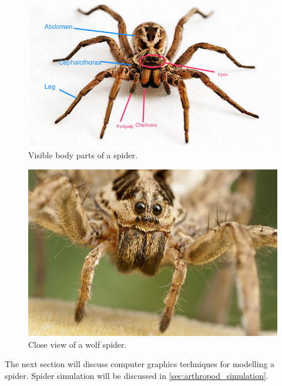 \begin{figure}[ht!]
\centering
\includegraphics[width=14cm]{figures/partsOfSpider.png}
\caption{Visible body parts of a spider. \protect\footnotemark}
\label{fig:partsOfSpider}
\end{figure}


\begin{figure}[ht!]
\centering
\includegraphics[width=14cm]{figures/wolfspidereyes.jpg}
\caption{Close view of a wolf spider. \protect\footnotemark}
\label{fig:closeViewSpider}
\end{figure}


The next section will discuss computer graphics techniques for modelling a spider. Spider simulation will be discussed in \ref{sec:arthropod_simulation}.



